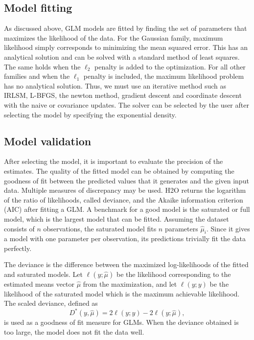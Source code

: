\subsection{Model fitting}
As discussed above, GLM models are fitted by finding the set of parameters that maximizes the likelihood of the data. For the Gaussian family, maximum likelihood simply corresponds to 
minimizing the mean squared error. This has an analytical solution and can be solved with a standard method of least squares. The same holds when the $\ell_2$ penalty is added to the optimization.  For all other families and when the $\ell_1$ penalty is included, the maximum likelihood problem has no analytical solution. Thus, we must use an iterative method such as IRLSM, L-BFGS, the newton method, gradient descent and coordinate descent with the naive or covariance updates. The solver can be selected by the user after selecting the model by specifying the exponential density. 

\subsection{Model validation}

After selecting the model, it is important to evaluate the precision of the estimates. The quality of the fitted model can be obtained 
by computing the goodness of fit between the predicted values that it generates and the given input data. Multiple measures of discrepancy may be used. H2O returns the logarithm of the ratio of likelihoods, called deviance, and the Akaike information criterion (AIC) after fitting a GLM. A benchmark for a good model is the saturated or full model, which is the largest model that can be fitted. Assuming the dataset consists of $n$ observations, the saturated model fits $n$ parameters $\hat{\mu}_i$. Since it gives a model with one parameter per observation, its predictions trivially fit the data perfectly.

The deviance is the difference between the maximized log-likelihoods of the fitted and saturated models. Let $\ell(y;\hat{\mu})$ be the likelihood corresponding to the estimated means vector $\hat{\mu}$ from the maximization, and let $\ell(y;y)$ be the likelihood of the saturated model which is the maximum achievable likelihood. The scaled deviance, defined as 
$$ D^*(y,\hat{\mu}) = 2\ell(y;y)-2\ell(y;\hat{\mu}),$$
is used as a goodness of fit measure for GLMs. When the deviance obtained is too large, the model does not fit the data well. 

